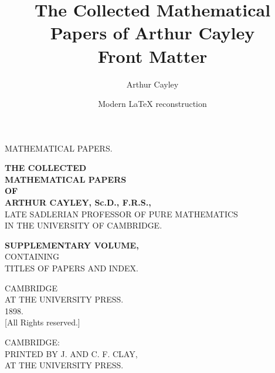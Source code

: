 \documentclass[11pt,a4paper]{book}
\title{The Collected Mathematical Papers of Arthur Cayley\\Front Matter}
\author{Arthur Cayley}
\date{Modern \LaTeX{} reconstruction}
\begin{document}
\maketitle


\thispagestyle{empty}
\begin{center}
\vspace*{2cm}

{\Large MATHEMATICAL PAPERS.}

\vspace{3cm}

{\LARGE\bfseries THE COLLECTED}\\[0.5em]
{\LARGE\bfseries MATHEMATICAL PAPERS}\\[0.5em]
{\large\bfseries OF}\\[0.5em]
{\LARGE\bfseries ARTHUR CAYLEY, Sc.D., F.R.S.,}\\[0.5em]
{\normalsize LATE SADLERIAN PROFESSOR OF PURE MATHEMATICS}\\
{\normalsize IN THE UNIVERSITY OF CAMBRIDGE.}

\vspace{1.5cm}

{\large\bfseries SUPPLEMENTARY VOLUME,}\\[0.3em]
{\normalsize CONTAINING}\\[0.3em]
{\large TITLES OF PAPERS AND INDEX.}

\vspace{2cm}

{\large CAMBRIDGE}\\
{\normalsize AT THE UNIVERSITY PRESS.}\\
{\normalsize 1898.}\\[0.3em]
{\small [All Rights reserved.]}

\vfill

{\small CAMBRIDGE:}\\
{\small PRINTED BY J. AND C. F. CLAY,}\\
{\small AT THE UNIVERSITY PRESS.}

\end{center}

\newpage
\end{document}
